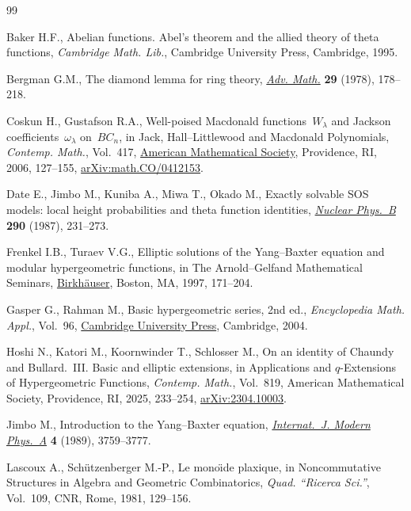 \documentclass[pdftex]{sigma}
\numberwithin{equation}{section}
\theoremstyle{definition}
\begin{document}
\begin{thebibliography}{99}
\footnotesize\itemsep=0pt

Baker H.F., Abelian functions. Abel's theorem and the allied theory of theta
 functions, \textit{Cambridge Math. Lib.}, Cambridge University Press, Cambridge, 1995.

Bergman G.M., The diamond lemma for ring theory,
 \href{https://doi.org/10.1016/0001-8708(78)90010-5}{\textit{Adv. Math.}}
 \textbf{29} (1978), 178--218.

Coskun H., Gustafson R.A., Well-poised {M}acdonald functions~{$W_\lambda$} and
 {J}ackson coefficients~{$\omega_\lambda$} on~{$BC_n$}, in Jack,
 {H}all--{L}ittlewood and {M}acdonald {P}olynomials, \textit{Contemp. Math.},
 Vol.~417, \href{https://doi.org/10.1090/conm/417/07919}{American Mathematical
 Society}, Providence, RI, 2006, 127--155,
 \href{http://arxiv.org/abs/math.CO/0412153}{arXiv:math.CO/0412153}.

Date E., Jimbo M., Kuniba A., Miwa T., Okado M., Exactly solvable {SOS} models:
 local height probabilities and theta function identities,
 \href{https://doi.org/10.1016/0550-3213(87)90187-8}{\textit{Nuclear Phys.~B}}
 \textbf{290} (1987), 231--273.

Frenkel I.B., Turaev V.G., Elliptic solutions of the {Y}ang--{B}axter equation
 and modular hypergeometric functions, in The {A}rnold--{G}elfand
 {M}athematical {S}eminars,
 \href{https://doi.org/10.1007/978-1-4612-4122-5_9}{Birkh\"auser}, Boston, MA,
 1997, 171--204.

Gasper G., Rahman M., Basic hypergeometric series, 2nd ed., \textit{Encyclopedia Math.
 Appl.}, Vol.~96,
 \href{https://doi.org/10.1017/CBO9780511526251}{Cambridge University Press}, Cambridge, 2004.

Hoshi N., Katori M., Koornwinder T., Schlosser M., On an identity of {C}haundy
 and {B}ullard.~{III}. Basic and elliptic extensions, in Applications and
 {$q$}-{E}xtensions of {H}ypergeometric {F}unctions, \textit{Contemp. Math.},
 Vol.~819, American Mathematical Society, Providence, RI, 2025, 233--254,
 \href{http://arxiv.org/abs/2304.10003}{arXiv:2304.10003}.

Jimbo M., Introduction to the {Y}ang--{B}axter equation,
 \href{https://doi.org/10.1142/S0217751X89001503}{\textit{Internat.~J. Modern
 Phys.~A}} \textbf{4} (1989), 3759--3777.

Lascoux A., Sch\"utzenberger M.-P., Le mono\"{\i}de plaxique, in Noncommutative
 {S}tructures in {A}lgebra and {G}eometric {C}ombinatorics, \textit{Quad.
 ``Ricerca Sci.''}, Vol.~109, CNR, Rome, 1981, 129--156.


\end{thebibliography}
\end{document}
